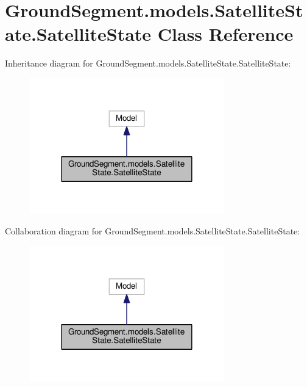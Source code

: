 \hypertarget{class_ground_segment_1_1models_1_1_satellite_state_1_1_satellite_state}{}\section{Ground\+Segment.\+models.\+Satellite\+State.\+Satellite\+State Class Reference}
\label{class_ground_segment_1_1models_1_1_satellite_state_1_1_satellite_state}


Inheritance diagram for Ground\+Segment.\+models.\+Satellite\+State.\+Satellite\+State\+:\nopagebreak
\begin{figure}[H]
\begin{center}
\leavevmode
\includegraphics[width=240pt]{class_ground_segment_1_1models_1_1_satellite_state_1_1_satellite_state__inherit__graph}
\end{center}
\end{figure}


Collaboration diagram for Ground\+Segment.\+models.\+Satellite\+State.\+Satellite\+State\+:\nopagebreak
\begin{figure}[H]
\begin{center}
\leavevmode
\includegraphics[width=240pt]{class_ground_segment_1_1models_1_1_satellite_state_1_1_satellite_state__coll__graph}
\end{center}
\end{figure}
